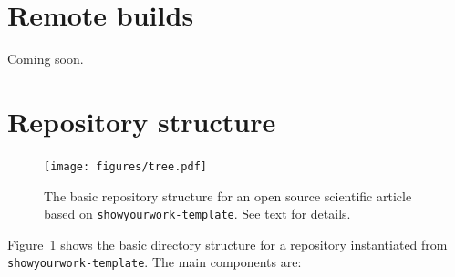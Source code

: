 \documentclass[twocolumn]{aastex631}
\begin{document}
\section{Remote builds}
\label{sec:remote-builds}
%
Coming soon.

\section{Repository structure}
\label{sec:struct}
%
\begin{figure}[ht!]
    \begin{centering}
        \texttt{[image: figures/tree.pdf]}
        \caption{
            The basic repository structure for an open source scientific article based on \texttt{showyourwork-template}.
            See text for details.
        }
        \label{fig:tree}
    \end{centering}
\end{figure}
%
Figure~\ref{fig:tree} shows the basic directory structure for a repository instantiated from \texttt{showyourwork-template}. 
The main components are:
\end{document}
